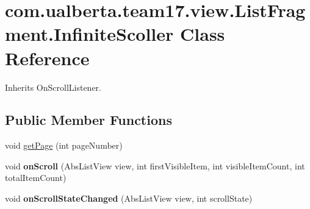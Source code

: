 \hypertarget{classcom_1_1ualberta_1_1team17_1_1view_1_1_list_fragment_1_1_infinite_scoller}{\section{com.\+ualberta.\+team17.\+view.\+List\+Fragment.\+Infinite\+Scoller Class Reference}
\label{classcom_1_1ualberta_1_1team17_1_1view_1_1_list_fragment_1_1_infinite_scoller}
}


Inherits On\+Scroll\+Listener.

\subsection*{Public Member Functions}
\begin{DoxyCompactItemize}
\item 
void \hyperlink{classcom_1_1ualberta_1_1team17_1_1view_1_1_list_fragment_1_1_infinite_scoller_a20b484877e11a924a5bedeebd1b7ac25}{get\+Page} (int page\+Number)
\item 
\hypertarget{classcom_1_1ualberta_1_1team17_1_1view_1_1_list_fragment_1_1_infinite_scoller_a00ad6cbda1bdd41c8d19bbea40889842}{void {\bfseries on\+Scroll} (Abs\+List\+View view, int first\+Visible\+Item, int visible\+Item\+Count, int total\+Item\+Count)}\label{classcom_1_1ualberta_1_1team17_1_1view_1_1_list_fragment_1_1_infinite_scoller_a00ad6cbda1bdd41c8d19bbea40889842}

\item 
\hypertarget{classcom_1_1ualberta_1_1team17_1_1view_1_1_list_fragment_1_1_infinite_scoller_a4bef401b32f226cdd8e20d86adf87cef}{void {\bfseries on\+Scroll\+State\+Changed} (Abs\+List\+View view, int scroll\+State)}\label{classcom_1_1ualberta_1_1team17_1_1view_1_1_list_fragment_1_1_infinite_scoller_a4bef401b32f226cdd8e20d86adf87cef}

\end{DoxyCompactItemize}


